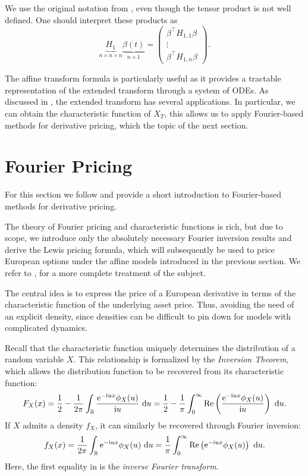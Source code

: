 \begin{remark}[(on notation)]
  We use the original notation from \parencite{Duffie2000}, even though the tensor product
   is not well defined. One should interpret these products as
  \[
    \underbrace{H_1}_{n\times n \times n} \underbrace{\beta(t)}_{n \times 1 } =  
    \begin{pmatrix}
      \beta^\top H_{1,1}\beta\\
      \vdots\\
      \beta^\top H_{1,n}\beta
    \end{pmatrix}.
  \]
\end{remark}
The affine transform formula is particularly useful as it provides a tractable representation of the
extended transform through a system of ODEs. As discussed in , the extended transform
has several applications. In particular, we can obtain the characteristic function of $X_T$, this
allows us to apply Fourier-based methods for derivative pricing, which the topic of the next
section.

\section{Fourier Pricing}
\label{sec:fourier}

For this section we follow \parencite{Schmelzle2010} and provide a short introduction to
Fourier-based methods for derivative pricing.

The theory of Fourier pricing and characteristic functions is rich, but due to scope, we introduce
only the absolutely necessary Fourier inversion results and derive the Lewis pricing formula, which
will subsequently be used to price European options under the affine models introduced in the
previous section. We refer to \parencite{Schmelzle2010}, for a more complete treatment of the
subject.

The central idea is to express the price of a European derivative in terms of the characteristic
function of the underlying asset price. Thus, avoiding the need of an explicit density, since
densities can be difficult to pin down for models with complicated dynamics. 

Recall that the characteristic function uniquely determines the distribution of a random
variable $X$. This relationship is formalized by the \emph{Inversion Theorem}, which allows
the distribution function to be recovered from its characteristic function:
\[
  F_X(x) = \frac{1}{2} - \frac{1}{2\pi} \int_{\mathbb{R}}
  \frac{\text{e}^{-\text{i} u x}\phi_X(u)}{\text{i} u} \text{ d} u
  = \frac{1}{2} - \frac{1}{\pi} \int_0^\infty
  \operatorname{Re}\left( \frac{\text{e}^{-\text{i} u x}\phi_X(u)}{\text{i} u} \right) \text{ d} u.
\]
If $X$ admits a density $f_X$, it can similarly be recovered through Fourier inversion:
\begin{equation}
  f_X(x) = \frac{1}{2\pi} \int_{\mathbb{R}} \text{e}^{-\text{i} u x}\phi_X(u) \text{ d} u
  = \frac{1}{\pi} \int_0^\infty
  \operatorname{Re}\left( \text{e}^{-\text{i} u x}\phi_X(u) \right) \text{ d} u
  \label{eq:inv-ft}
.\end{equation}
Here, the first equality in  is the \emph{inverse Fourier transform}.

